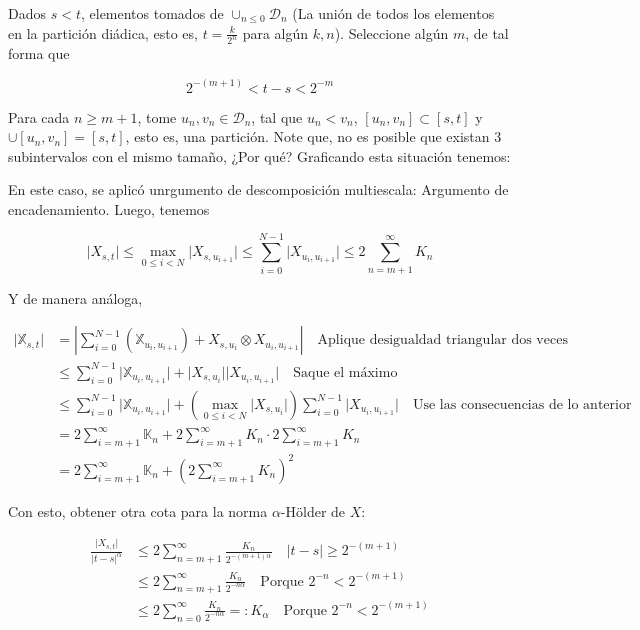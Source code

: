 Dados $s < t$, elementos tomados de $\cup_{n \leq 0} \mathcal{D}_n$ (La unión de todos los elementos en la partición diádica, esto es, $t = \frac{k}{2^n}$ para algún $k, n$). Seleccione algún $m$, de tal forma que 

\[
	2^{-(m + 1)} < t - s < 2^{-m}
\]

Para cada $n \geq m+1$, tome $u_n, v_n \in \mathcal{D}_n$, tal que $u_n < v_n$, $[u_n, v_n] \subset [s,t]$ y $\cup [u_n, v_n] = [s,t]$, esto es, una partición. Note que, no es posible que existan 3 subintervalos con el mismo tamaño, ¿Por qué? Graficando esta situación tenemos:


En este caso, se aplicó unrgumento de descomposición multiescala: Argumento de encadenamiento. Luego, tenemos

\[
	\lvert X_{s,t} \rvert \leq \max_{0 \leq i < N} \lvert X_{s, u_{i+1} } \rvert \leq \sum_{i = 0}^{N-1} \lvert X_{u_i, u_{i+1} } \rvert \leq 2 \sum_{n = m+1}^{\infty} K_n
\]

Y de manera análoga,

\begin{align*}
	\lvert \mathbb{X}_{s,t} \rvert &= \left\lvert \sum_{i = 0}^{N - 1} (\mathbb{X}_{u_i, u_{i+1}}) + X_{s,u_i} \otimes X_{u_i, u_{i + 1}} \right\rvert \quad \text{Aplique desigualdad triangular dos veces} \\
	&\leq \sum_{i = 0}^{N - 1} \lvert \mathbb{X}_{u_i, u_{i+1}} \rvert + \lvert X_{s, u_i} \rvert \lvert X_{u_i, u_{i + 1}} \rvert \quad \text{Saque el máximo} \\
	&\leq \sum_{i = 0}^{N - 1} \lvert \mathbb{X}_{u_i, u_{i+1}} \rvert + \left( \max_{0 \leq i < N} \lvert X_{s, u_i} \rvert \right) \sum_{i = 0}^{N - 1} \lvert X_{u_i, u_{i + 1}} \rvert \quad \text{Use las consecuencias de lo anterior} \\
	&= 2 \sum_{i = m + 1}^{\infty} \mathbb{K}_n + 2 \sum_{i = m + 1}^{\infty} K_n \cdot 2 \sum_{i = m + 1}^{\infty} K_n \\
	&=  2 \sum_{i = m + 1}^{\infty} \mathbb{K}_n + \left( 2 \sum_{i = m + 1}^{\infty} K_n \right)^2
\end{align*}


Con esto, obtener otra cota para la norma $\alpha$-Hölder de $X$:

\begin{align*}
	\frac{ \lvert X_{s,t} \rvert }{ \lvert t - s \rvert^{\alpha} } &\leq 2 \sum_{n = m + 1}^{\infty} \frac{K_n}{2^{-(m+1) \alpha}} \quad \lvert t - s \rvert \geq 2^{-(m+1)} \\
	&\leq 2 \sum_{n = m + 1}^{\infty} \frac{K_n}{2^{-n \alpha}} \quad \text{Porque } 2^{-n} < 2^{-(m+1)} \\
	&\leq 2 \sum_{n = 0}^{\infty} \frac{K_n}{2^{-n \alpha}} =: K_{\alpha} \quad \text{Porque } 2^{-n} < 2^{-(m+1)} \\
\end{align*}

